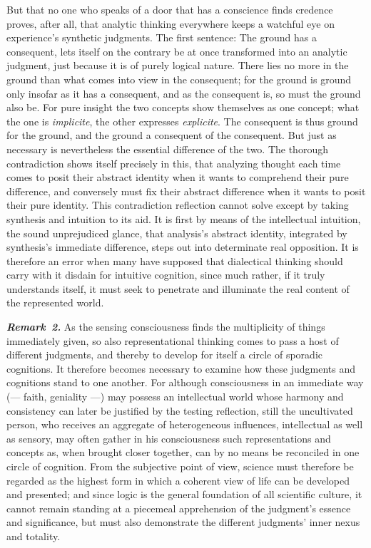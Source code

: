 \documentclass[12pt]{book}
\newcommand{\anm}[1]{\emph{\textbf{Remark~#1.}}}
\begin{document}
But that no one who speaks of a door that has a conscience finds credence
proves, after all, that analytic thinking everywhere keeps a watchful eye on
experience's synthetic judgments. The first sentence: The ground has a
consequent, lets itself on the contrary be at once transformed into an
analytic judgment, just because it is of purely logical nature. There lies
no more in the ground than what comes into view in the consequent; for the
ground is ground only insofar as it has a consequent, and as the consequent
is, so must the ground also be. For pure insight the two concepts show
themselves as one concept; what the one is \textit{implicite}, the other
expresses \textit{explicite}. The consequent is thus ground for the ground,
and the ground a consequent of the consequent. But just as necessary is
nevertheless the essential difference of the two. The thorough contradiction
shows itself precisely in this, that analyzing thought each time comes to
posit their abstract identity when it wants to comprehend their pure
difference, and conversely must fix their abstract difference when it wants
to posit their pure identity. This contradiction reflection cannot solve
except by taking synthesis and intuition to its aid. It is first by means of
the intellectual intuition, the sound unprejudiced glance, that analysis's
abstract identity, integrated by synthesis's immediate difference, steps out
into determinate real opposition. It is therefore an error when many have
supposed that dialectical thinking should carry with it disdain for
intuitive cognition, since much rather, if it truly understands itself, it
must seek to penetrate and illuminate the real content of the represented
world.

\anm{2} As the sensing consciousness finds the multiplicity of things
immediately given, so also representational thinking comes to pass a host of
different judgments, and thereby to develop for itself a circle of sporadic
cognitions. It therefore becomes necessary to examine how these judgments
and cognitions stand to one another. For although consciousness in an
immediate way (--- faith, geniality ---) may possess an intellectual world
whose harmony and consistency can later be justified by the testing
reflection, still the uncultivated person, who receives an aggregate of
heterogeneous influences, intellectual as well as sensory, may often gather
in his consciousness such representations and concepts as, when brought
closer together, can by no means be reconciled in one circle of cognition.
From the subjective point of view, science must therefore be regarded as the
highest form in which a coherent view of life can be developed and
presented; and since logic is the general foundation of all scientific
culture, it cannot remain standing at a piecemeal apprehension of the
judgment's essence and significance, but must also demonstrate the different
judgments' inner nexus and totality.
\end{document}
